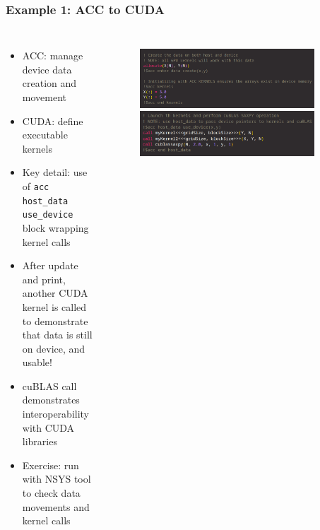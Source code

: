 \begin{frame}
	\frametitle{Example 1: ACC to CUDA}
	\begin{columns}
		\begin{itemize}
			\item ACC: manage device data creation and movement
			\item CUDA: define executable kernels
			\item Key detail: use of \texttt{acc host\_data use\_device} block wrapping kernel calls
			\item After update and print, another CUDA kernel is called to demonstrate that data is still on device, and usable!
			\item cuBLAS call demonstrates interoperability with CUDA libraries
			\item Exercise: run with NSYS tool to check data movements and kernel calls
		\end{itemize}
		\begin{figure}
			\centering
			\includegraphics[width=0.9\textwidth]{images/acc2cuda_data.png}
			\includegraphics[width=0.9\textwidth]{images/acc2cuda_kernels.png}
		\end{figure}
	\end{columns}
\end{frame}

